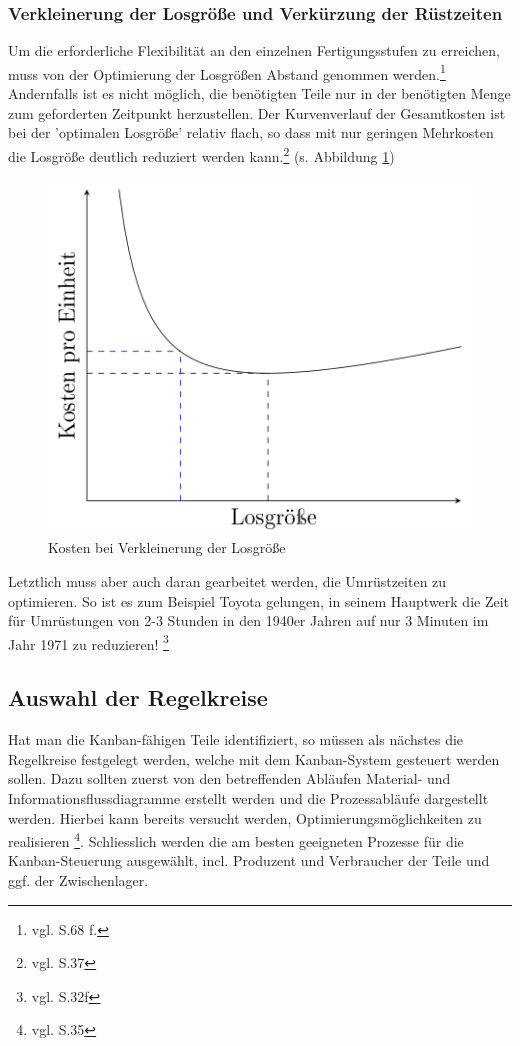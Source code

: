 \subsubsection{Verkleinerung der Losgröße und Verkürzung der Rüstzeiten}
Um die erforderliche Flexibilität an den einzelnen Fertigungsstufen zu erreichen, 
muss von der Optimierung der Losgrößen Abstand genommen werden.\footnote{vgl. \cite{Takeda2012SPS} S.68 f.}
Andernfalls ist es nicht möglich, die benötigten Teile nur in der benötigten Menge zum geforderten Zeitpunkt herzustellen.
Der Kurvenverlauf der Gesamtkosten ist bei der 'optimalen Losgröße' relativ flach, 
so dass mit nur geringen Mehrkosten die Losgröße deutlich reduziert werden kann.\footnote{vgl. \cite{Geiger2011Kanban} S.37}
(s. Abbildung \ref{Losgroesse})
\begin{figure}[h]
\centering
\includegraphics[width=.60\textwidth]{img/losgroessenverkleinerung.png}
\caption[Kosten bei Verkleinerung der Losgröße]{Kosten bei Verkleinerung der Losgröße\footnotemark}
\label{Losgroesse}
\end{figure}

Letztlich muss aber auch daran gearbeitet werden, die Umrüstzeiten zu optimieren.
So ist es zum Beispiel Toyota gelungen, in seinem Hauptwerk die Zeit für Umrüstungen von 
2-3 Stunden in den 1940er Jahren auf nur 3 Minuten im Jahr 1971 zu reduzieren! \footnote{vgl. \cite{Ohno2013TPS} S.32f}

\subsection{Auswahl der Regelkreise}
Hat man die Kanban-fähigen Teile identifiziert, so müssen als nächstes die Regelkreise festgelegt werden, welche mit dem Kanban-System gesteuert werden sollen.
Dazu sollten zuerst von den betreffenden Abläufen Material- und Informationsflussdiagramme erstellt werden und die Prozessabläufe dargestellt werden.
Hierbei kann bereits versucht werden, Optimierungsmöglichkeiten zu realisieren \footnote{vgl. \cite{Geiger2011Kanban} S.35}. 
Schliesslich werden die am besten geeigneten Prozesse für die Kanban-Steuerung ausgewählt, 
incl. Produzent und Verbraucher der Teile und ggf. der Zwischenlager.

